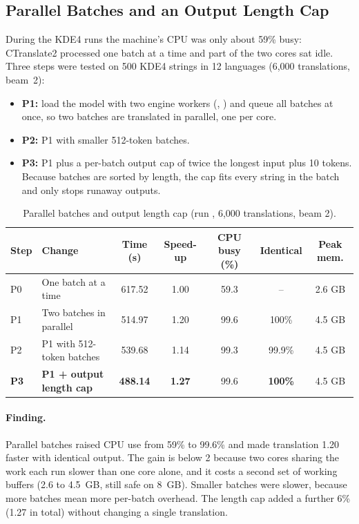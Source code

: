 \subsection{Parallel Batches and an Output Length Cap}
During the KDE4 runs the machine's CPU was only about 59\% busy: CTranslate2 processed one batch at a time and part of the
two cores sat idle. Three steps were tested on 500 KDE4 strings in 12 languages (6,000 translations, beam~2):

\begin{itemize}
  \item \textbf{P1:} load the model with two engine workers (, ) and queue all
        batches at once, so two batches are translated in parallel, one per core.
  \item \textbf{P2:} P1 with smaller 512-token batches.
  \item \textbf{P3:} P1 plus a per-batch output cap of twice the longest input plus 10 tokens. Because batches are sorted by
        length, the cap fits every string in the batch and only stops runaway outputs.
\end{itemize}

\begin{table}[H]
\centering
\caption[Parallel batches and output length cap]{Parallel batches and output length cap (run , 6,000 translations, beam 2).}
\label{tab:parallel}
\begin{tabular}{@{}l l S[table-format=3.2] S[table-format=1.2] S[table-format=2.1] c c@{}}
\toprule
\textbf{Step} & \textbf{Change} & {\textbf{Time (s)}} & {\textbf{Speed-up}} & {\textbf{CPU busy (\%)}} & \textbf{Identical} & \textbf{Peak mem.} \\
\midrule
P0 & One batch at a time & 617.52 & 1.00 & 59.3 & -- & 2.6 GB \\
P1 & Two batches in parallel & 514.97 & 1.20 & 99.6 & 100\% & 4.5 GB \\
P2 & P1 with 512-token batches & 539.68 & 1.14 & 99.3 & 99.9\% & 4.5 GB \\
\textbf{P3} & \textbf{P1 + output length cap} & \bfseries 488.14 & \bfseries 1.27 & 99.6 & \textbf{100\%} & 4.5 GB \\
\bottomrule
\end{tabular}
\end{table}

\paragraph{Finding.} Parallel batches raised CPU use from 59\% to 99.6\% and made translation 1.20\x{} faster with
identical output. The gain is below 2\x{} because two cores sharing the work each run slower than one core alone, and
it costs a second set of working buffers (2.6 to 4.5~GB, still safe on 8~GB). Smaller batches were slower, because more
batches mean more per-batch overhead. The length cap added a further 6\% (1.27\x{} in total) without changing a single
translation.

